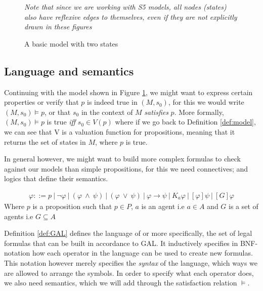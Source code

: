 \begin{figure}[h]
	\label{fig:basicEM}
	\caption{A basic model with two states}
	\centering
	\break \textit{Note that since we are working with S5 models, all nodes (states) also have reflexive edges to themselves, even if they are not explicitly drawn in these figures}
\end{figure}

\subsection{Language and semantics}

Continuing with the model shown in Figure \ref{fig:basicEM}, we might want to express certain properties or verify that $p$ is indeed true in $(M,s_0)$, for this we would write $(M,s_0) \models p$, or that $s_0$ in the context of $M$ \textit{satisfies} $p$. More formally, $(M,s_0) \models p$ is true \textit{iff} $s_0 \in V(p)$ where if we go back to Definition \ref{def:model}, we can see that V is a valuation function for propositions, meaning that it returns the set of states in $M$, where $p$ is true. 

In general however, we might want to build more complex formulas to check against our models than simple propositions, for this we need connectives; and logics that define their semantics.

\begin{definition} \hfill
	\label{def:GAL}
 	\begin{align*}
		\varphi ::= p \ | ~\neg\varphi ~|~ (\varphi~\wedge~\psi) ~|~ (\varphi~\vee~\psi) ~|~ \varphi 							\rightarrow \psi ~|~ K_a\varphi ~|~ [\varphi]\psi  ~|~ [G]\varphi
	\end{align*}
	Where $p$ is a proposition such that $p \in P$, $a$ is an agent i.e $a \in A$ and $G$ is a set of agents i.e $G \subseteq A$
\end{definition}

Definition \ref{def:GAL} defines the language of  or more specifically, the set of legal formulas that can be built in accordance to GAL. It inductively specifies in BNF-notation how each operator in the language can be used to create new formulas. This notation however merely specifies the \textit{syntax} of the language, which ways we are allowed to arrange the symbols. In order to specify what each operator does, we also need semantics, which we will add through the satisfaction relation $\models$.

